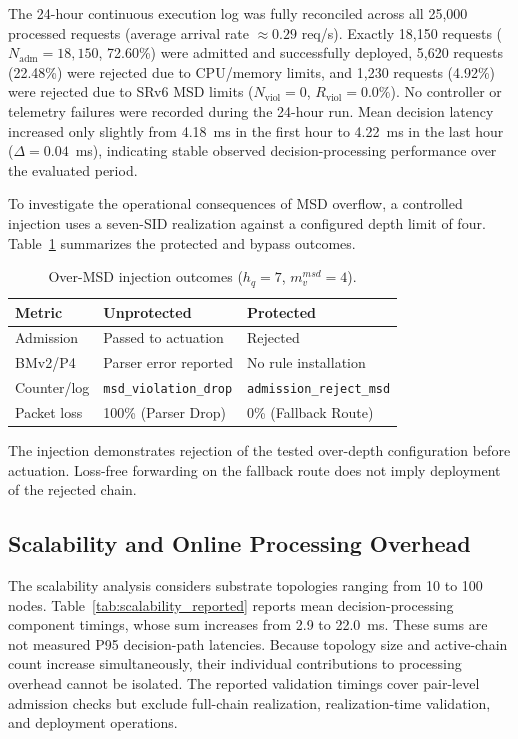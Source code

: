 \documentclass[final,5p]{elsarticle}
\newcommand{\rev}[1]{\textcolor{BrickRed}{#1}}
\begin{document}
\rev{The 24-hour continuous execution log was fully reconciled across all 25,000 processed requests (average arrival rate $\approx 0.29$ req/s). Exactly 18,150 requests ($N_{\text{adm}} = 18,150$, 72.60\%) were admitted and successfully deployed, 5,620 requests (22.48\%) were rejected due to CPU/memory limits, and 1,230 requests (4.92\%) were rejected due to SRv6 MSD limits ($N_{\text{viol}} = 0$, $R_{\text{viol}} = 0.0\%$). No controller or telemetry failures were recorded during the 24-hour run. Mean decision latency increased only slightly from 4.18~ms in the first hour to 4.22~ms in the last hour ($\Delta=0.04$~ms), indicating stable observed decision-processing performance over the evaluated period.}

\rev{To investigate the operational consequences of MSD overflow, a controlled injection uses a seven-SID realization against a configured depth limit of four. Table~\ref{tab:over_msd_injection} summarizes the protected and bypass outcomes.}

\begin{table}[!tb]
\centering
\caption{\rev{Over-MSD injection outcomes} (\(h_q=7\), \(m_v^{msd}=4\)).}
\label{tab:over_msd_injection}
\renewcommand{\arraystretch}{1.10}
\small
\begin{tabularx}{\linewidth}{p{1.6cm}XX}
\toprule
Metric & Unprotected & Protected \\
\midrule
Admission & Passed to actuation & Rejected \\
BMv2/P4 & Parser error reported & No rule installation \\
Counter/log & \texttt{msd\_violation\_drop} & \texttt{admission\_reject\_msd} \\
Packet loss & 100\% (Parser Drop) & 0\% (Fallback Route) \\
\bottomrule
\end{tabularx}
\end{table}

\rev{The injection demonstrates rejection of the tested over-depth configuration before actuation. Loss-free forwarding on the fallback route does not imply deployment of the rejected chain.}


\subsection{Scalability and Online Processing Overhead}
\label{subsec:scalability_path_sensitivity}

\rev{The scalability analysis considers substrate topologies ranging from 10 to 100 nodes. Table~\ref{tab:scalability_reported} reports mean decision-processing component timings, whose sum increases from 2.9 to 22.0~ms. These sums are not measured P95 decision-path latencies. Because topology size and active-chain count increase simultaneously, their individual contributions to processing overhead cannot be isolated. The reported validation timings cover pair-level admission checks but exclude full-chain realization, realization-time validation, and deployment operations.}
\end{document}
